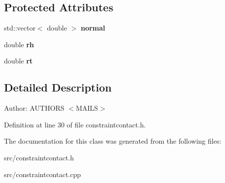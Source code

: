 \subsection*{Protected Attributes}
\begin{CompactItemize}
\item 
\hypertarget{classmknix_1_1ConstraintContact_06ba5460d950b98b85226e7b9b520df2}{
std::vector$<$ double $>$ \textbf{normal}}
\label{classmknix_1_1ConstraintContact_06ba5460d950b98b85226e7b9b520df2}

\item 
\hypertarget{classmknix_1_1ConstraintContact_86b0413ea70c74a38f8610a88cba48c6}{
double \textbf{rh}}
\label{classmknix_1_1ConstraintContact_86b0413ea70c74a38f8610a88cba48c6}

\item 
\hypertarget{classmknix_1_1ConstraintContact_0a2b6bbee4925e12f4921aa58f0f3426}{
double \textbf{rt}}
\label{classmknix_1_1ConstraintContact_0a2b6bbee4925e12f4921aa58f0f3426}

\end{CompactItemize}


\subsection{Detailed Description}
\begin{Desc}
\item[Author:]AUTHORS $<$MAILS$>$ \end{Desc}


Definition at line 30 of file constraintcontact.h.

The documentation for this class was generated from the following files:\begin{CompactItemize}
\item 
src/constraintcontact.h\item 
src/constraintcontact.cpp\end{CompactItemize}
